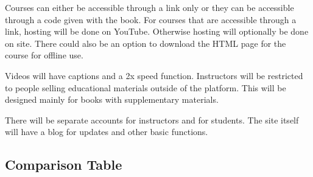 \documentclass{article}
\begin{document}
Courses can either be accessible through a link only or they can be accessible through a code given with the book. For courses that are accessible through a link, hosting will be done on YouTube. Otherwise hosting will optionally be done on site. There could also be an option to download the HTML page for the course for offline use.

Videos will have captions and a 2x speed function. Instructors will be restricted to people selling educational materials outside of the platform. This will be designed mainly for books with supplementary materials.

There will be separate accounts for instructors and for students. The site itself will have a blog for updates and other basic functions.

\subsection{Comparison Table}
\end{document}
